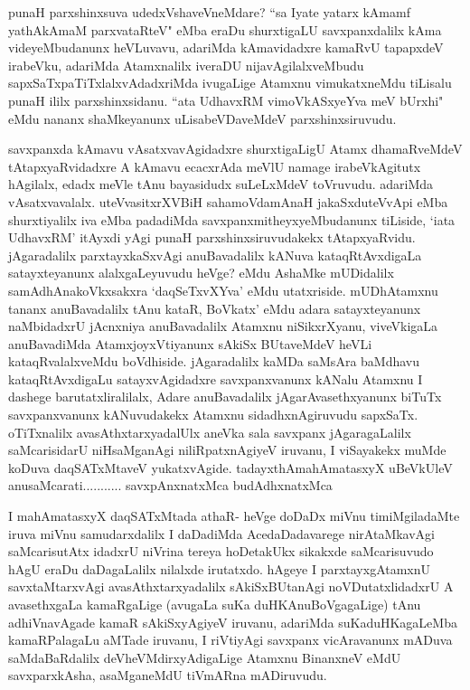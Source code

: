 \begin{artha}
punaH parxshinxsuva udedxVshaveVneMdare? ``sa Iyate yatarx kAmamf yathAkAmaM parxvataRteV" eMba eraDu shurxtigaLU savxpanxdalilx kAma videyeMbudanunx heVLuvavu, adariMda kAmavidadxre kamaRvU tapapxdeV irabeVku, adariMda Atamxnalilx iveraDU nijavAgilalxveMbudu sapxSaTxpaTiTxlalxvAdadxriMda ivugaLige Atamxnu vimukatxneMdu tiLisalu punaH ililx parxshinxsidanu. ``ata UdhavxRM vimoVkASxyeYva meV bUrxhi" eMdu nananx shaMkeyanunx uLisabeVDaveMdeV parxshinxsiruvudu.
\end{artha}

\begin{artha}
savxpanxda kAmavu vAsatxvavAgidadxre shurxtigaLigU Atamx dhamaRveMdeV tAtapxyaRvidadxre A kAmavu ecacxrAda meVlU namage irabeVkAgitutx hAgilalx, edadx meVle tAnu bayasidudx suLeLxMdeV toVruvudu. adariMda vAsatxvavalalx. uteVvasitxrXVBiH sahamoVdamAnaH jakaSxduteVvApi eMba shurxtiyalilx iva eMba padadiMda savxpanx\break mitheyxyeMbudanunx tiLiside, `iata UdhavxRM' itAyxdi yAgi punaH parxshinxsiruvudakekx tAtapxyaRvidu. jAgaradalilx parxtayxkaSxvAgi anuBavadalilx kANuva kataqRtAvxdigaLa satayxteyanunx alalxgaLeyuvudu heVge? eMdu AshaMke mUDidalilx samAdhAnakoVkxsakxra `daqSeTxvXYva' eMdu utatxriside. mUDhAtamxnu tananx anuBavadalilx tAnu kataR, BoVkatx' eMdu adara satayxteyanunx naMbidadxrU jAcnxniya anuBavadalilx Atamxnu niSikxrXyanu, viveVkigaLa anuBavadiMda AtamxjoyxVtiyanunx sAkiSx BUtaveMdeV heVLi kataqRvalalxveMdu boVdhiside. jAgaradalilx kaMDa saMsAra baMdhavu kataqRtAvxdigaLu satayxvAgidadxre savxpanxvanunx kANalu Atamxnu I dashege barutatxliralilalx, Adare anuBavadalilx jAgarAvasethxyanunx biTuTx savxpanxvanunx kANuvudakekx Atamxnu sidadhxnAgiruvudu sapxSaTx. oTiTxnalilx avasAthxtarxyadalUlx aneVka sala savxpanx jAgaragaLalilx saMcarisidarU niHsaMganAgi niliRpatxnAgiyeV iruvanu, I viSayakekx muMde koDuva daqSATxMtaveV yukatxvAgide. 
tadayxthAmahAmatasxyX uBeVkUleV anusaMcarati........... savxpAnxnatxMca budAdhxnatxMca
\end{artha}%

\begin{artha}
I mahAmatasxyX daqSATxMtada athaR- heVge doDaDx miVnu timiMgiladaMte iruva miVnu samudarxdalilx I daDadiMda AcedaDadavarege nirAtaMkavAgi saMcarisutAtx idadxrU niVrina tereya hoDetakUkx sikakxde saMcarisuvudo hAgU eraDu daDagaLalilx nilalxde irutatxdo. hAgeye I parxtayxgAtamxnU savxtaMtarxvAgi avasAthxtarxyadalilx sAkiSxBUtanAgi noVDutatxlidadxrU A avasethxgaLa kamaRgaLige (avugaLa suKa duHKAnuBoVgagaLige) tAnu adhiVnavAgade kamaR sAkiSxyAgiyeV iruvanu, adariMda suKaduHKagaLeMba kamaRPalagaLu aMTade iruvanu, I riVtiyAgi savxpanx vicAravanunx mADuva saMdaBaRdalilx deVheVMdirxyAdigaLige Atamxnu BinanxneV eMdU savxparxkAsha, asaMganeMdU tiVmARna mADiruvudu. 
\end{artha}%

